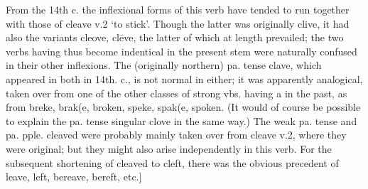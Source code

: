\begin{description}[wide, labelwidth=!, labelindent=0pt]
\noindent
From the 14th c. the inflexional forms of this verb have tended to run together with those of cleave v.2 ‘to stick’. Though the latter was originally clive, it had also the variants cleove, clēve, the latter of which at length prevailed; the two verbs having thus become indentical in the present stem were naturally confused in their other inflexions. The (originally northern) pa. tense clave, which appeared in both in 14th. c., is not normal in either; it was apparently analogical, taken over from one of the other classes of strong vbs. having a in the past, as from breke, brak(e, broken, speke, spak(e, spoken. (It would of course be possible to explain the pa. tense singular clove in the same way.) The weak pa. tense and pa. pple. cleaved were probably mainly taken over from cleave v.2, where they were original; but they might also arise independently in this verb. For the subsequent shortening of cleaved to cleft, there was the obvious precedent of leave, left, bereave, bereft, etc.]
\vspace{-0.3cm}

\begin{myenumerate}









\end{myenumerate}
\end{description}
